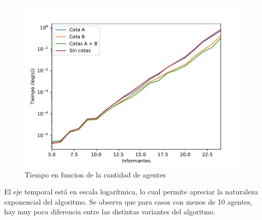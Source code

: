 \documentclass{article}
\begin{document}
\begin{figure}[h]
\caption{Tiempo en funcion de la cantidad de agentes}
\centering
\includegraphics[scale=0.5]{Agentes_st.pdf}
\end{figure}

El eje temporal está en escala logarítmica, lo cual permite apreciar la naturaleza exponencial del algoritmo. 
Se observa que para casos con menos de 10 agentes, hay muy poca diferencia entre las distintas variantes del algoritmo.
\end{document}
